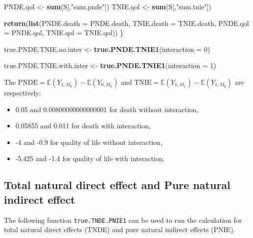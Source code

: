 \documentclass[
]{book}
\newenvironment{Shaded}{\begin{snugshade}}{\end{snugshade}}
\newcommand{\AttributeTok}[1]{\textcolor[rgb]{0.13,0.29,0.53}{#1}}
\newcommand{\DecValTok}[1]{\textcolor[rgb]{0.00,0.00,0.81}{#1}}
\newcommand{\FunctionTok}[1]{\textcolor[rgb]{0.13,0.29,0.53}{\textbf{#1}}}
\newcommand{\NormalTok}[1]{#1}
\newcommand{\OtherTok}[1]{\textcolor[rgb]{0.56,0.35,0.01}{#1}}
\newcommand{\StringTok}[1]{\textcolor[rgb]{0.31,0.60,0.02}{#1}}
\providecommand{\tightlist}{%
  \setlength{\itemsep}{0pt}\setlength{\parskip}{0pt}}
\begin{document}
\begin{Shaded}
\begin{Highlighting}[]
\NormalTok{  PNDE.qol }\OtherTok{\textless{}{-}} \FunctionTok{sum}\NormalTok{(S[,}\StringTok{"sum.pnde"}\NormalTok{])}
\NormalTok{  TNIE.qol }\OtherTok{\textless{}{-}} \FunctionTok{sum}\NormalTok{(S[,}\StringTok{"sum.tnie"}\NormalTok{])}
  
  \FunctionTok{return}\NormalTok{(}\FunctionTok{list}\NormalTok{(}\AttributeTok{PNDE.death =}\NormalTok{ PNDE.death, }\AttributeTok{TNIE.death =}\NormalTok{ TNIE.death, }
              \AttributeTok{PNDE.qol =}\NormalTok{ PNDE.qol, }\AttributeTok{TNIE.qol =}\NormalTok{ TNIE.qol))}
\NormalTok{\}}
\end{Highlighting}
\end{Shaded}

\begin{Shaded}
\begin{Highlighting}[]
\NormalTok{true.PNDE.TNIE.no.inter }\OtherTok{\textless{}{-}} \FunctionTok{true.PNDE.TNIE1}\NormalTok{(}\AttributeTok{interaction =} \DecValTok{0}\NormalTok{)}

\NormalTok{true.PNDE.TNIE.with.inter }\OtherTok{\textless{}{-}} \FunctionTok{true.PNDE.TNIE1}\NormalTok{(}\AttributeTok{interaction =} \DecValTok{1}\NormalTok{)}
\end{Highlighting}
\end{Shaded}

The \(\text{PNDE}=\mathbb{E}\left( Y_{1,M_0}\right) - \mathbb{E}\left(Y_{0,M_0}\right)\) and \(\text{TNIE}=\mathbb{E}\left( Y_{1,M_1}\right) - \mathbb{E}\left(Y_{1,M_0}\right)\) are respectively:

\begin{itemize}
\tightlist
\item
  0.05 and 0.00800000000000001 for death without interaction,
\item
  0.05855 and 0.011 for death with interaction,
\item
  -4 and -0.9 for quality of life without interaction,
\item
  -5.425 and -1.4 for quality of life with interaction.
\end{itemize}

\hypertarget{total-natural-direct-effect-and-pure-natural-indirect-effect}{%
\subsection{Total natural direct effect and Pure natural indirect effect}\label{total-natural-direct-effect-and-pure-natural-indirect-effect}}

The following function \texttt{true.TNDE.PNIE1} can be used to run the calculation for total natural direct effects (TNDE) and pure natural indirect effects (PNIE).
\end{document}
